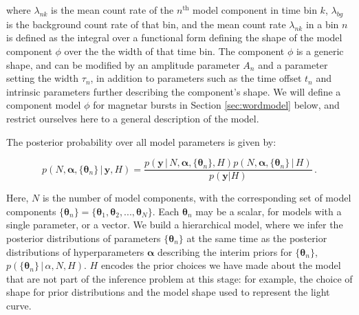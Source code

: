 \documentclass[12pt]{emulateapj}
\newcommand{\given}{\,|\,}
\newcommand{\counts}{y}
\newcommand{\pars}{\theta}
\newcommand{\mean}{\lambda}
\newcommand{\Poisson}{{\mathcal P}}
\newcommand{\bg}{\mathrm{bg}}
\newcommand{\word}{\phi}
\begin{document}
where $\mean_{nk}$ is the mean count rate of the $n^{\mathrm{th}}$ model component in time bin $k$, 
$\mean_{bg}$ is the background count rate of that bin,
and the mean count rate $\mean_{nk}$ in a bin $n$ is defined as the integral over a functional form defining the shape of
the model component $\word$ over the the width of that time bin. The component $\word$ is a generic shape,
and can be modified by an amplitude parameter $A_n$ and a parameter setting the width $\tau_n$, in addition to
parameters such as the time offset $t_n$ and intrinsic parameters further describing the component's shape.
We will define a component model $\word$ for magnetar bursts in Section \ref{sec:wordmodel} below, and
restrict ourselves here to a general description of the model.
 

The posterior probability over all model parameters is given by:

\begin{equation}
p(N, \bm{\alpha},\{\bm{\theta}_n \} \given \bm{\counts}, H) = \frac{p(\bm{\counts} \given N, \bm{\alpha}, \{\bm{\theta}_n \}, H) p(N, \bm{\alpha}, \{\bm{\theta}_n \} \given H)}{p(\bm{\counts} | H)} \, .
\end{equation}

Here, $N$ is the number of model components, with the corresponding set of model components $\{\bm{\theta}_n\} = \{ \bm{\theta}_1, \bm{\theta}_2, ..., \bm{\theta}_N \}$. Each $\bm{\theta}_n$ may be a scalar, for models with a single parameter, or a vector. 
We build a hierarchical model, where we infer the posterior distributions of parameters $\{\bm{\theta}_n\}$ at the same time as the posterior distributions of hyperparameters $\bm{\alpha}$ describing the
interim priors for  $\{\bm{\theta}_n\}$, $p(\{\bm{\theta}_n\}\given \alpha, N, H)$.
$H$ encodes the prior choices we have
made about the model that are not part of the inference problem at this stage: for example, the choice of shape for prior distributions and the model shape used to represent the light curve.
\end{document}
